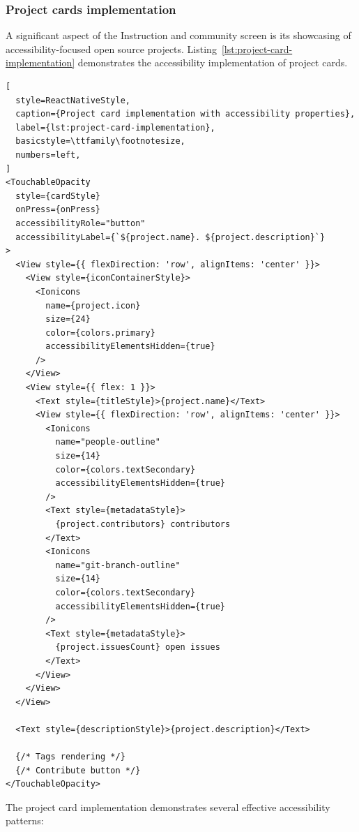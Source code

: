 \subsubsection{Project cards implementation}

A significant aspect of the Instruction and community screen is its showcasing of accessibility-focused open source projects. Listing~\ref{lst:project-card-implementation} demonstrates the accessibility implementation of project cards.

\begin{lstlisting}[
  style=ReactNativeStyle,
  caption={Project card implementation with accessibility properties},
  label={lst:project-card-implementation},
  basicstyle=\ttfamily\footnotesize,
  numbers=left,
]
<TouchableOpacity
  style={cardStyle}
  onPress={onPress}
  accessibilityRole="button"
  accessibilityLabel={`${project.name}. ${project.description}`}
>
  <View style={{ flexDirection: 'row', alignItems: 'center' }}>
    <View style={iconContainerStyle}>
      <Ionicons 
        name={project.icon} 
        size={24} 
        color={colors.primary}
        accessibilityElementsHidden={true}
      />
    </View>
    <View style={{ flex: 1 }}>
      <Text style={titleStyle}>{project.name}</Text>
      <View style={{ flexDirection: 'row', alignItems: 'center' }}>
        <Ionicons 
          name="people-outline" 
          size={14} 
          color={colors.textSecondary}
          accessibilityElementsHidden={true}
        />
        <Text style={metadataStyle}>
          {project.contributors} contributors
        </Text>
        <Ionicons 
          name="git-branch-outline" 
          size={14} 
          color={colors.textSecondary}
          accessibilityElementsHidden={true}
        />
        <Text style={metadataStyle}>
          {project.issuesCount} open issues
        </Text>
      </View>
    </View>
  </View>
  
  <Text style={descriptionStyle}>{project.description}</Text>
  
  {/* Tags rendering */}
  {/* Contribute button */}
</TouchableOpacity>
\end{lstlisting}

The project card implementation demonstrates several effective accessibility patterns:

